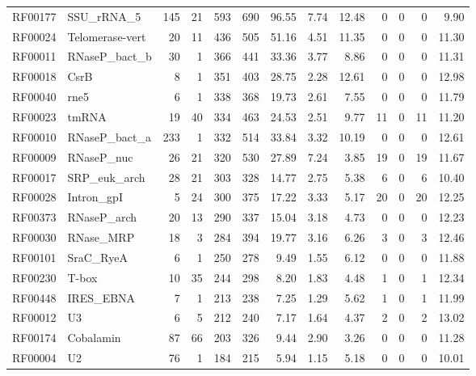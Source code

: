 \begin{table}
\begin{center}
\begin{tabular}{|ll|rr|rr|r|rr|rrrr|}
RF00177 & SSU\_rRNA\_5    &   145 &    21 &   593 & 690 &  96.55 &   7.74 &  12.48 &   0 &  0 &  0 &   9.90 \\
RF00024 & Telomerase-vert &    20 &    11 &   436 & 505 &  51.16 &   4.51 &  11.35 &   0 &  0 &  0 &  11.30 \\
RF00011 & RNaseP\_bact\_b &    30 &     1 &   366 & 441 &  33.36 &   3.77 &   8.86 &   0 &  0 &  0 &  11.31 \\
RF00018 & CsrB            &     8 &     1 &   351 & 403 &  28.75 &   2.28 &  12.61 &   0 &  0 &  0 &  12.98 \\
RF00040 & rne5            &     6 &     1 &   338 & 368 &  19.73 &   2.61 &   7.55 &   0 &  0 &  0 &  11.79 \\
RF00023 & tmRNA           &    19 &    40 &   334 & 463 &  24.53 &   2.51 &   9.77 &  11 &  0 & 11 &  11.20 \\
RF00010 & RNaseP\_bact\_a &   233 &     1 &   332 & 514 &  33.84 &   3.32 &  10.19 &   0 &  0 &  0 &  12.61 \\
RF00009 & RNaseP\_nuc     &    26 &    21 &   320 & 530 &  27.89 &   7.24 &   3.85 &  19 &  0 & 19 &  11.67 \\
RF00017 & SRP\_euk\_arch  &    28 &    21 &   303 & 328 &  14.77 &   2.75 &   5.38 &   6 &  0 &  6 &  10.40 \\
RF00028 & Intron\_gpI     &     5 &    24 &   300 & 375 &  17.22 &   3.33 &   5.17 &  20 &  0 & 20 &  12.25 \\
RF00373 & RNaseP\_arch    &    20 &    13 &   290 & 337 &  15.04 &   3.18 &   4.73 &   0 &  0 &  0 &  12.23 \\
RF00030 & RNase\_MRP      &    18 &     3 &   284 & 394 &  19.77 &   3.16 &   6.26 &   3 &  0 &  3 &  12.46 \\
RF00101 & SraC\_RyeA      &     6 &     1 &   250 & 278 &   9.49 &   1.55 &   6.12 &   0 &  0 &  0 &  11.88 \\
RF00230 & T-box           &    10 &    35 &   244 & 298 &   8.20 &   1.83 &   4.48 &   1 &  0 &  1 &  12.34 \\
RF00448 & IRES\_EBNA      &     7 &     1 &   213 & 238 &   7.25 &   1.29 &   5.62 &   1 &  0 &  1 &  11.99 \\
RF00012 & U3              &     6 &     5 &   212 & 240 &   7.17 &   1.64 &   4.37 &   2 &  0 &  2 &  13.02 \\
RF00174 & Cobalamin       &    87 &    66 &   203 & 326 &   9.44 &   2.90 &   3.26 &   0 &  0 &  0 &  11.28 \\
RF00004 & U2              &    76 &     1 &   184 & 215 &   5.94 &   1.15 &   5.18 &   0 &  0 &  0 &  10.01 \\

\end{tabular}
\end{center}
\end{table}
